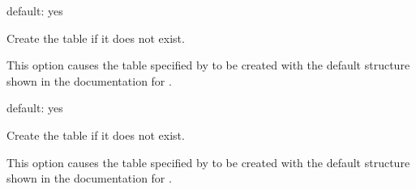 \documentclass[letterpaper,10pt,english]{sphinxmanual}
\begin{document}
\begin{fulllineitems}
\label{\detokenize{mariadb-query-digest:cmdoption-mariadb-query-digest-no-create-history-table}}
default: yes

Create the {\hyperref[\detokenize{mariadb-query-digest:cmdoption-mariadb-query-digest-history}]{}} table if it does not exist.

This option causes the table specified by {\hyperref[\detokenize{mariadb-query-digest:cmdoption-mariadb-query-digest-history}]{}} to be created
with the default structure shown in the documentation for {\hyperref[\detokenize{mariadb-query-digest:cmdoption-mariadb-query-digest-history}]{}}.

\end{fulllineitems}


\begin{fulllineitems}
\label{\detokenize{mariadb-query-digest:cmdoption-mariadb-query-digest-no-create-review-table}}
default: yes

Create the {\hyperref[\detokenize{mariadb-query-digest:cmdoption-mariadb-query-digest-review}]{}} table if it does not exist.

This option causes the table specified by {\hyperref[\detokenize{mariadb-query-digest:cmdoption-mariadb-query-digest-review}]{}} to be created
with the default structure shown in the documentation for {\hyperref[\detokenize{mariadb-query-digest:cmdoption-mariadb-query-digest-review}]{}}.

\end{fulllineitems}
\end{document}
